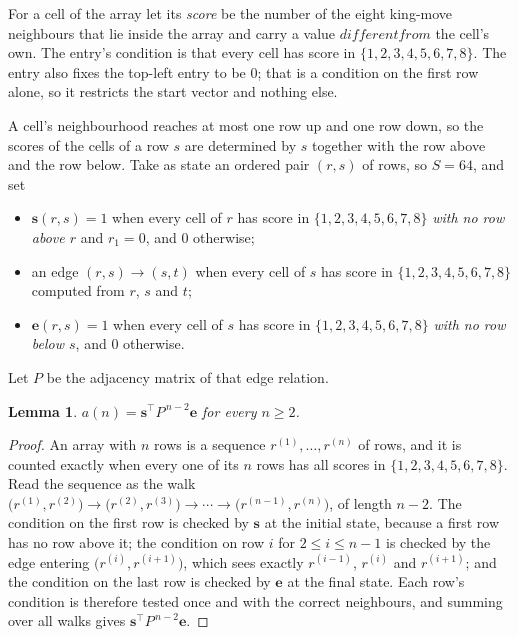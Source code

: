 \documentclass[11pt,a4paper]{article}
\theoremstyle{plain}
\newtheorem{lemma}[theorem]{Lemma}
\theoremstyle{definition}
\begin{document}
For a cell of the array let its \emph{score} be the number of the eight king-move neighbours that lie inside
the array and carry a value $different from$ the cell's own. The entry's condition is that every cell
has score in $\{1,2,3,4,5,6,7,8\}$. The entry also fixes the top-left entry to be $0$; that is a condition on the first row alone, so it restricts the start vector and nothing else.

A cell's neighbourhood reaches at most one row up and one row down, so the scores of the
cells of a row $s$ are determined by $s$ together with the row above and the row below.
Take as state an ordered pair $(r,s)$ of rows, so $S=64$, and set
\begin{itemize}
\item $\mathbf{s}(r,s)=1$ when every cell of $r$ has score in $\{1,2,3,4,5,6,7,8\}$ \emph{with no row
above $r$} and $r_1=0$, and $0$ otherwise;
\item an edge $(r,s)\to(s,t)$ when every cell of $s$ has score in $\{1,2,3,4,5,6,7,8\}$ computed from
$r$, $s$ and $t$;
\item $\mathbf{e}(r,s)=1$ when every cell of $s$ has score in $\{1,2,3,4,5,6,7,8\}$ \emph{with no row
below $s$}, and $0$ otherwise.
\end{itemize}
Let $P$ be the adjacency matrix of that edge relation.

\begin{lemma}\label{lem:walk}
$a(n)=\mathbf{s}^{\!\top}P^{\,n-2}\mathbf{e}$ for every $n\ge2$.
\end{lemma}

\begin{proof}
An array with $n$ rows is a sequence $r^{(1)},\dots,r^{(n)}$ of rows, and it is counted
exactly when every one of its $n$ rows has all scores in $\{1,2,3,4,5,6,7,8\}$. Read the sequence as the
walk $\bigl(r^{(1)},r^{(2)}\bigr)\to\bigl(r^{(2)},r^{(3)}\bigr)\to\cdots\to
\bigl(r^{(n-1)},r^{(n)}\bigr)$, of length $n-2$. The condition on the first row is
checked by $\mathbf{s}$ at the initial state, because a first row has no row above it; the
condition on row $i$ for $2\le i\le n-1$ is checked by the edge entering
$\bigl(r^{(i)},r^{(i+1)}\bigr)$, which sees exactly $r^{(i-1)}$, $r^{(i)}$ and
$r^{(i+1)}$; and the condition on the last row is checked by $\mathbf{e}$ at the final
state. Each row's condition is therefore tested once and with the correct neighbours, and
summing over all walks gives $\mathbf{s}^{\!\top}P^{\,n-2}\mathbf{e}$.
\end{proof}
\end{document}
